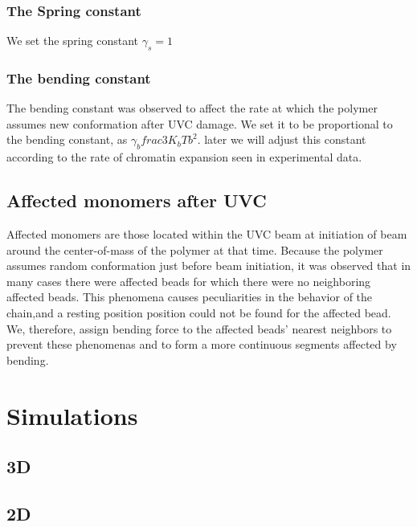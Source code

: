\documentclass[12pt]{report}
\begin{document}
     \subsubsection{The Spring constant}
       We set the spring constant $\gamma_s =1$
     \subsubsection{The bending constant}       
       The bending constant was observed to affect the rate at which the polymer assumes new conformation after UVC damage.
       We set it to be proportional to the bending constant, as $\gamma_b frac{3K_bT}{b^2}$. later we will adjust this constant according to the rate of chromatin expansion seen in experimental data. 
     \subsection{Affected monomers after UVC}
      Affected monomers are those located within the UVC beam at initiation of beam around the center-of-mass of the polymer at that time. Because the polymer assumes random conformation just before beam initiation, it was observed that in many cases there were affected beads for which there were no neighboring affected beads. This phenomena causes peculiarities in the behavior of the chain,and a resting position position could not be found for the affected bead. We, therefore, assign bending force to the affected beads' nearest neighbors to prevent these phenomenas and to form a more continuous segments affected by bending. 
             		
	\section{Simulations}
	
	\subsection{ 3D}
	\subsection{2D}
	
	
	
\end{document}
